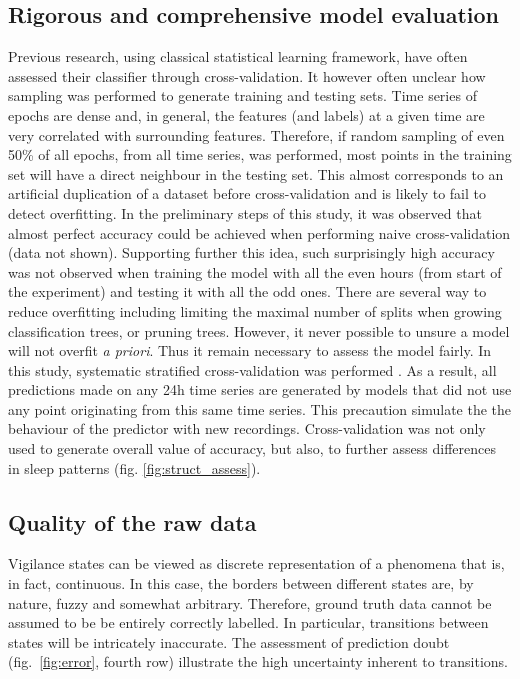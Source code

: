 \subsection{Rigorous and comprehensive model evaluation}

Previous research, using classical statistical learning framework,
have often assessed their classifier through cross-validation.
It however often unclear how sampling was performed to generate training and
testing sets\cite{ebrahimi_automatic_2008, chapotot_automated_2010, sen_comparative_2014}.
Time series of epochs are dense and, in general,
the features (and labels) at a given time are very correlated with surrounding features.
Therefore, if random sampling of even 50\% of all epochs, from all time series, was performed,
most points in the training set will have a direct neighbour in the testing set.
This almost corresponds to an artificial duplication of a dataset before cross-validation and is likely to fail to detect overfitting.
In the preliminary steps of this study, it was observed that almost perfect accuracy could be achieved when performing naive cross-validation (data not shown).
Supporting further this idea, such surprisingly high accuracy was not observed when training the model
with all the even hours (from start of the experiment) and testing it with all the odd ones.
There are several way to reduce overfitting including limiting the maximal number of splits when growing classification trees, or pruning trees.
However, it never possible to unsure a model will not overfit \emph{a priori}.
Thus it remain necessary to assess the model fairly.
In this study, systematic stratified cross-validation was
performed \cite{ding_querying_2008}.
As a result, all predictions made on any 24h time series are generated by models
that did not use any point originating from this same time series. This precaution simulate the the behaviour of the predictor with new recordings.
Cross-validation was not only used to generate overall value of accuracy, but also, to further assess differences in sleep patterns (fig. \ref{fig:struct_assess}).

\subsection{Quality of the raw data}

Vigilance states can be viewed as discrete representation of a phenomena that is, in fact, continuous.
In this case, the borders between different states are, by nature, fuzzy and somewhat arbitrary.
Therefore, ground truth data cannot be assumed to be be entirely correctly labelled.
In particular, transitions between states will be intricately inaccurate.
The assessment of prediction doubt (fig.~\ref{fig:error}, fourth row) illustrate the high uncertainty inherent to transitions.

